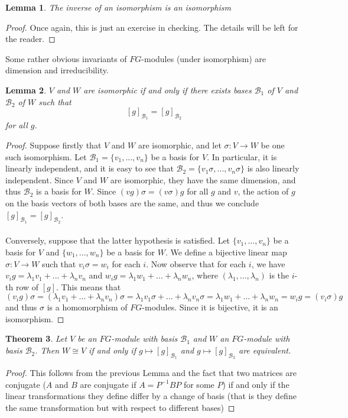 \documentclass[11pt, notitlepage]{article}
\numberwithin{equation}{section}
\theoremstyle{plain}
\newtheorem{theorem}{Theorem}[section]
\newtheorem{lemma}[theorem]{Lemma}
\theoremstyle{definition}
\newcommand{\mcl}{\mathcal}
\begin{document}
\begin{lemma}
	The inverse of an isomorphism is an isomorphism
\end{lemma}
\begin{proof}
	Once again, this is just an exercise in checking. The details will be left for the reader.
\end{proof}
Some rather obvious invariants of $FG$-modules (under isomorphism) are dimension and irreducibility.
\begin{lemma}
	$V$ and $W$ are isomorphic if and only if there exists bases $\mathcal{B}_1$ of $V$ and $\mathcal{B}_2$ of $W$ such that
\[
	[g]_{\mathcal{B}_1} = [g]_{\mathcal{B}_2}
\]
for all $g$.
\end{lemma}
\begin{proof}
	Suppose firstly that $V$ and $W$ are isomorphic, and let $\sigma: V \rightarrow W$ be one such isomorphism. Let $\mathcal{B}_1 = \{v_1,...,v_n\}$ be a basis for $V$. In particular, it is linearly independent, and it is easy to see that $\mathcal{B}_2 = \{v_1\sigma,...,v_n\sigma\}$ is also linearly independent. Since $V$ and $W$ are isomorphic, they have the same dimension, and thus $\mathcal{B}_2$ is a basis for $W$. Since $(vg)\sigma = (v\sigma)g$ for all $g$ and $v$, the action of $g$ on the basis vectors of both bases are the same, and thus we conclude $[g]_{\mathcal{B}_1} = [g]_{\mathcal{B}_2}$.
	\\\\
	Conversely, suppose that the latter hypothesis is satisfied. Let $\{v_1,...,v_n\}$ be a basis for $V$ and $\{w_1,...,w_n\}$ be a basis for $W$. We define a bijective linear map $\sigma: V \rightarrow W$ such that $v_i \sigma = w_i$ for each $i$. Now observe that for each $i$, we have  $v_ig = \lambda_1 v_1 + ... + \lambda_n v_n$ and $w_ig = \lambda_1 w_1 +...+ \lambda_n w_n$, where $(\lambda_1,...,\lambda_n)$ is the $i$-th row of $[g]$. This means that
\[
	(v_ig)\sigma = (\lambda_1 v_1 + ... + \lambda_n v_n)\sigma = \lambda_1 v_1\sigma + ... + \lambda_n v_n\sigma = \lambda_1 w_1 +...+ \lambda_n w_n = w_ig = (v_i\sigma)g
\]
and thus $\sigma$ is a homomorphism of $FG$-modules. Since it is bijective, it is an isomorphism.
\end{proof}
\begin{theorem}
	Let $V$ be an $FG$-module with basis $\mcl{B}_1$ and $W$ an $FG$-module with basis $\mcl{B}_2$. Then $W \cong V$ if and only if $g\mapsto [g]_{\mcl{B}_1}$ and $g\mapsto [g]_{\mcl{B}_2}$ are equivalent.
\end{theorem}
\begin{proof}
	This follows from the previous Lemma and the fact that two matrices are conjugate ($A$ and $B$ are conjugate if $A = P^{-1}B P$ for some $P$) if and only if the linear transformations they define differ by a change of basis (that is they define the same transformation but with respect to different bases)
\end{proof}
\end{document}

